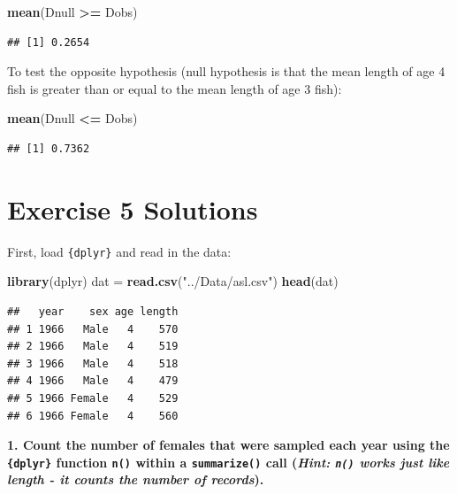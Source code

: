 \documentclass[]{book}
\newenvironment{Shaded}{\begin{snugshade}}{\end{snugshade}}
\newcommand{\KeywordTok}[1]{\textcolor[rgb]{0.13,0.29,0.53}{\textbf{#1}}}
\newcommand{\StringTok}[1]{\textcolor[rgb]{0.31,0.60,0.02}{#1}}
\newcommand{\OperatorTok}[1]{\textcolor[rgb]{0.81,0.36,0.00}{\textbf{#1}}}
\newcommand{\NormalTok}[1]{#1}
\theoremstyle{definition}
\theoremstyle{definition}
\theoremstyle{definition}
\theoremstyle{remark}
\begin{document}
\begin{Shaded}
\begin{Highlighting}[]
\KeywordTok{mean}\NormalTok{(Dnull }\OperatorTok{>=}\StringTok{ }\NormalTok{Dobs)}
\end{Highlighting}
\end{Shaded}

\begin{verbatim}
## [1] 0.2654
\end{verbatim}

To test the opposite hypothesis (null hypothesis is that the mean length
of age 4 fish is greater than or equal to the mean length of age 3
fish):

\begin{Shaded}
\begin{Highlighting}[]
\KeywordTok{mean}\NormalTok{(Dnull }\OperatorTok{<=}\StringTok{ }\NormalTok{Dobs)}
\end{Highlighting}
\end{Shaded}

\begin{verbatim}
## [1] 0.7362
\end{verbatim}

\hypertarget{ex5-answers}{\section*{Exercise 5
Solutions}\label{ex5-answers}}

First, load \texttt{\{dplyr\}} and read in the data:

\begin{Shaded}
\begin{Highlighting}[]
\KeywordTok{library}\NormalTok{(dplyr)}
\NormalTok{dat =}\StringTok{ }\KeywordTok{read.csv}\NormalTok{(}\StringTok{"../Data/asl.csv"}\NormalTok{)}
\KeywordTok{head}\NormalTok{(dat)}
\end{Highlighting}
\end{Shaded}

\begin{verbatim}
##   year    sex age length
## 1 1966   Male   4    570
## 2 1966   Male   4    519
## 3 1966   Male   4    518
## 4 1966   Male   4    479
## 5 1966 Female   4    529
## 6 1966 Female   4    560
\end{verbatim}

\textbf{1. Count the number of females that were sampled each year using
the \texttt{\{dplyr\}} function \texttt{n()} within a
\texttt{summarize()} call (\emph{Hint: \texttt{n()} works just like
length - it counts the number of records}).}
\end{document}
